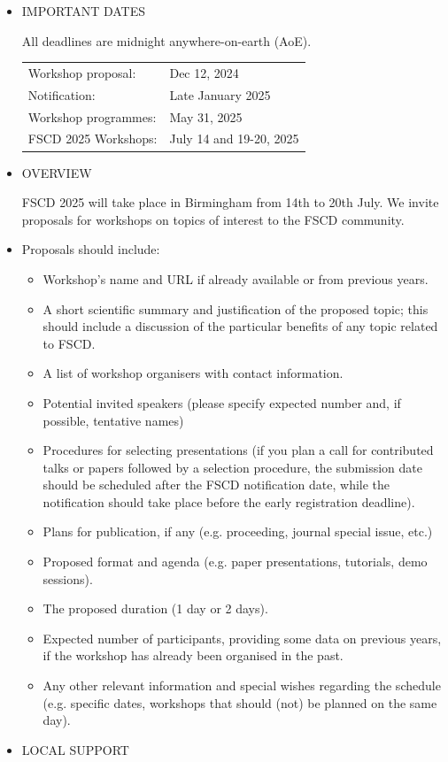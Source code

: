 \documentclass[prodmode,acmtecs]{acmsmall} %
\begin{document}
\begin{itemize}\item  IMPORTANT DATES 
 
  All deadlines are midnight anywhere-on-earth (AoE). 
 
\begin{tabulary}{\linewidth}{LL}Workshop proposal:  & Dec 12, 2024 \\
Notification:  & Late January 2025 \\
Workshop programmes:  & May 31, 2025 \\
FSCD 2025 Workshops:  & July 14 and 19-20, 2025 \\
\end{tabulary}
 
\item  OVERVIEW 
 
  FSCD 2025 will take place in Birmingham from 14th to 20th July. We invite proposals for workshops on topics of interest to the FSCD community. 
 
\item  Proposals should include: 
 
\begin{itemize}\item  Workshop's name and URL if already available or from previous years.
\item  A short scientific summary and justification of the proposed topic; this should include a discussion of the particular benefits of any topic related to FSCD.
\item  A list of workshop organisers with contact information. 
\item  Potential invited speakers (please specify expected number and, if possible, tentative names)
\item  Procedures for selecting presentations (if you plan a call for contributed talks or papers followed by a selection procedure, the submission date should be scheduled after the FSCD notification date, while the notification should take place before the early registration deadline).
\item  Plans for publication, if any (e.g. proceeding, journal special issue, etc.)
\item  Proposed format and agenda (e.g. paper presentations, tutorials, demo sessions).
\item  The proposed duration (1 day or 2 days).
\item  Expected number of participants, providing some data on previous years, if the workshop has already been organised in the past.
\item  Any other relevant information and special wishes regarding the schedule (e.g. specific dates, workshops that should (not) be planned on the same day).
\end{itemize} 
\item  LOCAL SUPPORT 
 

\end{itemize}
\end{document}

